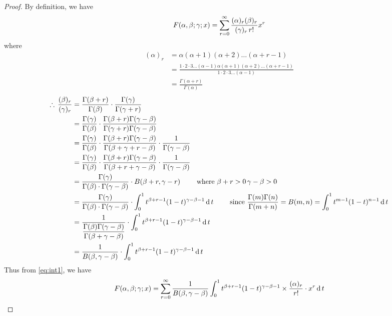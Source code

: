 \documentclass[../main-sheet.tex]{subfiles}
\begin{document}
\begin{proof}
    By definition, we have
    \begin{equation}
        F(\alpha,\beta;\gamma;x)=\sum_{r=0}^\infty \frac{(\alpha)_r (\beta)_r}{(\gamma)_r\,r!}x^r \label{eq:int1}
    \end{equation}
    where
    \begin{align*}
        (\alpha)_r&=\alpha(\alpha+1)(\alpha+2)\dots(\alpha+r-1)\\
        &=\frac{1\cdot2\cdot3\dots(\alpha-1)\alpha(\alpha+1)(\alpha+2)\dots(\alpha+r-1)}{1\cdot2\cdot3\dots(\alpha-1)}\\
        &=\frac{\Gamma(\alpha+r)}{\Gamma(\alpha)}
    \end{align*}
    \begin{align*}
        \therefore\, \frac{(\beta)_r}{(\gamma)_r}&=\frac{\Gamma(\beta+r)}{\Gamma(\beta)}\cdot\frac{\Gamma(\gamma)}{\Gamma(\gamma+r)}\\
        &=\frac{\Gamma(\gamma)}{\Gamma(\beta)}\cdot\frac{\Gamma(\beta+r)\Gamma(\gamma-\beta)}{\Gamma(\gamma+r)\Gamma(\gamma-\beta)}\\
        &=\frac{\Gamma(\gamma)}{\Gamma(\beta)}\cdot\frac{\Gamma(\beta+r)\Gamma(\gamma-\beta)}{\Gamma(\beta+\gamma+r-\beta)}\cdot\frac{1}{\Gamma(\gamma-\beta)}\\
        &=\frac{\Gamma(\gamma)}{\Gamma(\beta)}\cdot\frac{\Gamma(\beta+r)\Gamma(\gamma-\beta)}{\Gamma(\beta+r+\gamma-\beta)}\cdot\frac{1}{\Gamma(\gamma-\beta)}\\
        &=\frac{\Gamma(\gamma)}{\Gamma(\beta)\cdot\Gamma(\gamma-\beta)}\cdot B(\beta+r,\gamma-r)\qquad\text{ where } \beta+r>0\,\gamma-\beta>0\\
        &=\frac{\Gamma(\gamma)}{\Gamma(\beta)\cdot\Gamma(\gamma-\beta)}\cdot\int_0^1 t^{\beta+r-1}(1-t)^{\gamma-\beta-1}\,\mathrm{d}\, t\qquad\text{ since }\frac{\Gamma(m)\Gamma(n)}{\Gamma(m+n)}=B(m,n)=\int_0^1 t^{m-1}(1-t)^{n-1}\,\mathrm{d}\, t\\
        &=\frac{1}{\displaystyle \frac{\Gamma(\beta)\Gamma(\gamma-\beta)}{\Gamma(\beta+\gamma-\beta)}}\cdot\int_0^1 t^{\beta+r-1}(1-t)^{\gamma-\beta-1}\,\mathrm{d}\, t\\
        &=\frac{1}{B(\beta,\gamma-\beta)}\cdot\int_0^1 t^{\beta+r-1}(1-t)^{\gamma-\beta-1}\,\mathrm{d}\, t
    \end{align*}
    Thus from \eqref{eq:int1}, we have
    \begin{align*}
        F(\abgx)&=\sum_{r=0}^\infty\frac{1}{B(\beta,\gamma-\beta)}\int_0^1 t^{\beta+r-1}(1-t)^{\gamma-\beta-1}\times\frac{(\alpha)_r}{r!}\cdot x^r\D t\\

\end{align*}
\end{proof}
\end{document}
